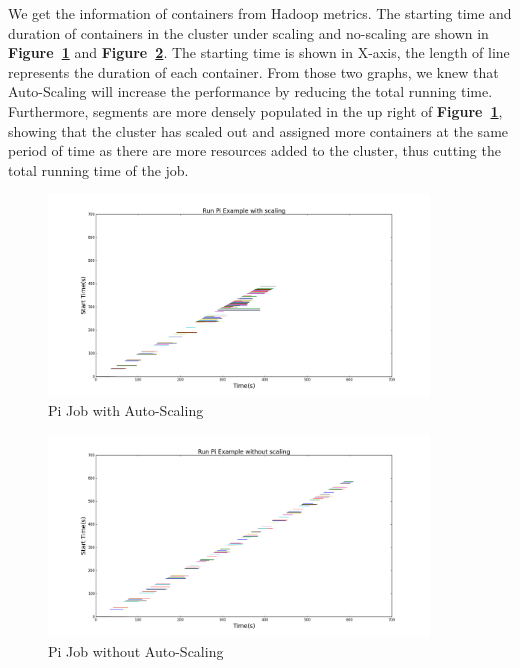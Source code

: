 \documentclass{article}
\begin{document}
We get the information of containers from Hadoop metrics.
The starting time and duration of containers in the cluster under scaling and no-scaling are shown in \textbf{Figure~\ref{fig:scaling_pi}} and \textbf{Figure~\ref{fig:no_scaling_pi}}. The starting time is shown in X-axis, the length of line represents the duration of each container. From those two graphs, we knew that Auto-Scaling will increase the performance by reducing the total running time. Furthermore, segments are more densely populated in the up right of \textbf{Figure~\ref{fig:scaling_pi}}, showing that the cluster has scaled out and assigned more containers at the same period of time as there are more resources added to the cluster, thus cutting the total running time of the job.
\begin{figure}[ht!]
 \centering
 \includegraphics[width=0.9\textwidth,natwidth=1000,natheight=800]{scaling_pi.png}
 \caption{Pi Job with Auto-Scaling}
 \label{fig:scaling_pi}
 \end{figure}
\begin{figure}[ht!]
 \centering
 \includegraphics[width=0.9\textwidth,natwidth=1000,natheight=800]{no_scaling_pi.png}
 \caption{Pi Job without Auto-Scaling}
 \label{fig:no_scaling_pi}
 \end{figure}
\end{document}
